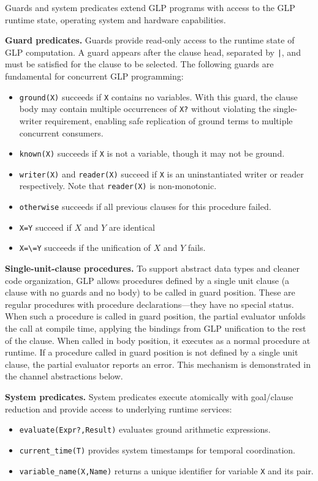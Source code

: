 \documentclass[runningheads,thm-restate]{llncs}
\newcommand{\mypara}[1]{\smallskip\noindent\textbf{#1.}}
\begin{document}
Guards and system predicates extend GLP programs with access to the GLP runtime state, operating system and hardware capabilities.

\mypara{Guard predicates}
Guards provide read-only access to the runtime state of GLP computation. A guard appears after the clause head, separated by \verb=|=, and must be satisfied for the clause to be selected. The following guards are fundamental for concurrent GLP programming:

\begin{itemize}
\item \verb|ground(X)| succeeds if \verb|X| contains no variables. With this guard, the clause body may contain multiple occurrences of \verb|X?| without violating the single-writer requirement, enabling safe replication of ground terms to multiple concurrent consumers.
\item \verb|known(X)| succeeds if \verb|X| is not a variable, though it may not be ground.
\item \verb|writer(X)| and \verb|reader(X)| succeed if  \verb|X| is an uninstantiated writer or reader respectively.  Note that \verb|reader(X)| is non-monotonic.
\item \verb|otherwise| succeeds if all previous clauses for this procedure failed.
\item \verb|X=Y| succeed if $X$ and $Y$ are identical
\item \verb|X=\=Y| succeeds if the unification of $X$ and $Y$ fails. 
\end{itemize}

\mypara{Single-unit-clause procedures}
To support abstract data types and cleaner code organization, GLP allows procedures defined by a single unit clause (a clause with no guards and no body) to be called in guard position. These are regular procedures with procedure declarations---they have no special status. When such a procedure is called in guard position, the partial evaluator unfolds the call at compile time, applying the bindings from GLP unification to the rest of the clause. When called in body position, it executes as a normal procedure at runtime. If a procedure called in guard position is not defined by a single unit clause, the partial evaluator reports an error. This mechanism is demonstrated in the channel abstractions below.

\mypara{System predicates}
System predicates execute atomically with goal/clause reduction and provide access to underlying runtime services:
\begin{itemize}
\item \verb|evaluate(Expr?,Result)| evaluates ground arithmetic expressions.
\item \verb|current_time(T)| provides system timestamps for temporal coordination.
\item \verb|variable_name(X,Name)| returns a unique identifier for variable \verb|X| and its pair.
\end{itemize}
\end{document}
